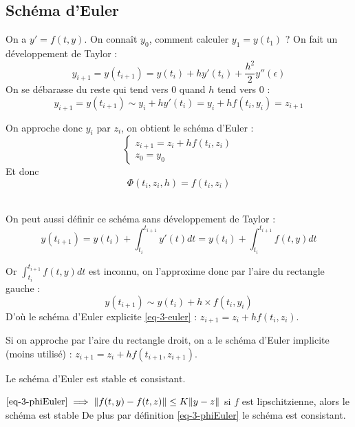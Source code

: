	\subsection{Schéma d'Euler}

		On a $y' = f(t, y)$. On connaît $y_0$, comment calculer $y_1 = y(t_1)$ ? On fait un développement de Taylor :
		$$
			y_{i+1} = y(t_{i+1}) = y(t_i) + hy'(t_i) + \frac{h^2}{2}y''(\epsilon)
		$$
		On se débarasse du reste qui tend vers 0 quand $h$ tend vers 0 :
		$$
			y_{i+1} = y(t_{i+1}) \sim y_i + hy'(t_i) = y_i + hf(t_i, y_i) = z_{i+1}
		$$

		On approche donc $y_i$ par $z_i$, on obtient le schéma d'Euler :
		\begin{equation}
			\label{eq-3-euler}
			\begin{cases}
				z_{i+1} = z_i + hf(t_i, z_i)		\\
				z_0 = y_0
			\end{cases}
		\end{equation}
		Et donc
		\begin{equation}
			\label{eq-3-phiEuler}
			\Phi(t_i,z_i,h) = f(t_i,z_i)
		\end{equation}
		~
		\bigskip

		On peut aussi définir ce schéma sans développement de Taylor :
		\begin{equation}
			\label{eq-3-dev}
			y(t_{i+1}) 	= y(t_i) + \int_{t_i}^{t_{i+1}} y'(t)dt
						= y(t_i) + \int_{t_i}^{t_{i+1}} f(t,y)dt			
		\end{equation}

		Or $\int_{t_i}^{t_{i+1}} f(t,y)dt$ est inconnu, on l'approxime donc par l'aire du rectangle gauche :
		\begin{equation}
			y(t_{i+1}) \sim y(t_i) + h\times f(t_i, y_i)
		\end{equation}
		D'où le schéma d'Euler explicite \eqref{eq-3-euler} : $z_{i+1} = z_i + hf(t_i,z_i)$.

		Si on approche par l'aire du rectangle droit, on a le schéma d'Euler implicite (moins utilisé) : $z_{i+1} = z_i + hf(t_{i+1}, z_{i+1})$.

		\bigskip

		\begin{propShort}
			Le schéma d'Euler est stable et consistant.
		\end{propShort}
		\begin{preuve}
			$ \eqref{eq-3-phiEuler} \implies \lVert f(t,y) -f(t,z) \rVert \leq K\lVert y-z \rVert $
			si $f$ est lipschitzienne, alors le schéma est stable
			De plus par définition \eqref{eq-3-phiEuler} le schéma est consistant.
		\end{preuve}

